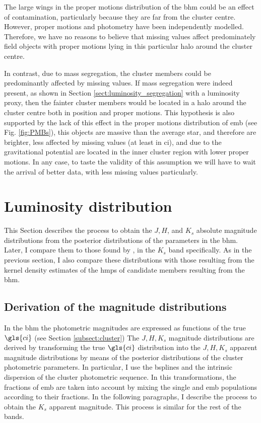The large wings in the proper motions distribution of the \gls{bhm} could be an effect of contamination, particularly because they are far from the cluster centre. However, proper motions and photometry have been independently modelled. Therefore, we have no reasons to believe that missing values affect predominately field objects with proper motions lying in this particular halo around the cluster centre. 

In contrast, due to mass segregation, the cluster members could be predominantly affected by missing values. If mass segregation were indeed present, as shown in Section \ref{sect:luminosity_segregation} with a luminosity proxy, then the fainter cluster members would be located in a halo around the cluster centre both in position and proper motions. This hypothesis is also supported by the lack of this effect in the proper motions distribution of \gls{emb} (see Fig. \ref{fig:PMBs}), this objects are massive than the average star, and therefore are brighter, less affected by missing values (at least in \gls{ci}), and due to the gravitational potential are located in the inner cluster region with lower proper motions. In any case, to taste the validity of this assumption we will have to wait the arrival of better data, with less missing values particularly.


\section{Luminosity distribution}
\label{sect:luminosity}
This Section describes the process to obtain the $J,H$, and $K_s$ absolute magnitude distributions from the posterior distributions of the parameters in the \gls{bhm}. Later, I compare them to those found by \citet{Bouy2015}, in the $K_s$ band specifically. As in the previous section, I also compare these distributions with those resulting from the kernel density estimates of the \gls{hmps} of candidate members resulting from the \gls{bhm}.

\subsection{Derivation of the magnitude distributions}
\label{subsect:deriveluminosity}

In the \gls{bhm} the photometric magnitudes are expressed as functions of the true $\gls{ci}$ (see Section \ref{subsect:cluster})
The $J,H,K_s$ magnitude distributions are derived by transforming the true $\gls{ci}$ distribution into the $J,H,K_s$ apparent magnitude distributions by means of the posterior distributions of the cluster photometric parameters. In particular, I use the \glspl{bspline} and the intrinsic dispersion of the cluster photometric sequence. In this transformations, the fractions of \gls{emb} are taken into account by mixing the single and \gls{emb} populations according to their fractions. In the following paragraphs, I describe the process to obtain the $K_s$ apparent magnitude. This process is similar for the rest of the bands. 

